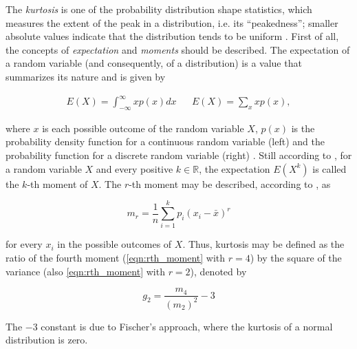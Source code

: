 
The \emph{kurtosis} is one of the probability distribution shape statistics, which measures the extent of the peak in a distribution, i.e. its ``peakedness''; smaller absolute values indicate that the distribution tends to be uniform \cite{zwillinger1999crc}. First of all, the concepts of \emph{expectation} and \emph{moments} should be described. The expectation of a random variable (and consequently, of a distribution) is a value that summarizes its nature and is given by

\begin{align}
\label{eqn:expectation}
E(X) = \int_{-\infty}^{\infty} x p(x)dx
&&
E(X) = \sum_{x} x p(x),
\end{align}

\noindent where $x$ is each possible outcome of the random variable $X$, $p(x)$ is the probability density function for a continuous random variable (left) and the probability function for a discrete random variable (right) \cite{degroot2012probability}. Still according to , for a random variable $X$ and every positive $k \in \mathbb{R}$, the expectation $E(X^{k})$ is
called the $k$-th moment of $X$. The $r$-th moment may be described, according to , as

\begin{equation}
\label{eqn:rth_moment}
m_{r} = \frac{1}{n}
        \sum_{i=1}^{k}p_{i}(x_{i} - \bar{x})^{r}
\end{equation}

\noindent for every $x_{i}$ in the possible outcomes of $X$. Thus, kurtosis may be defined as the ratio of the fourth moment (\autoref{eqn:rth_moment} with $r = 4$) by the square of the variance (also \autoref{eqn:rth_moment} with $r = 2$), denoted by

\begin{equation}
\label{eqn:kurtosis}
g_{2} = \frac{m_{4}}{(m_{2})^{2}} - 3
\end{equation}

The $-3$ constant is due to Fischer's approach, where the kurtosis of a normal distribution is zero.